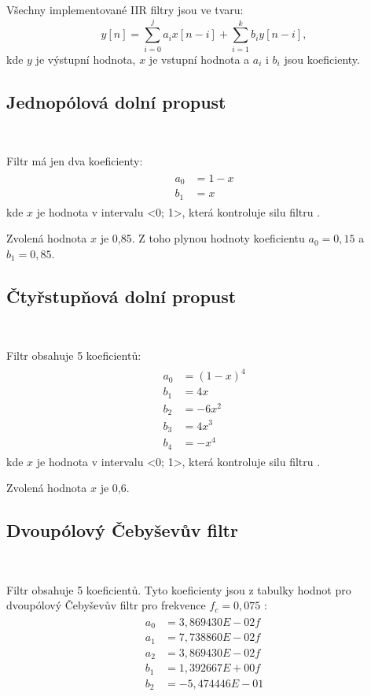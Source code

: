 Všechny implementované IIR filtry jsou ve tvaru:
\begin{equation}
y[n] = \sum_{i = 0}^{j}a_{i}x[n - i] + \sum_{i = 1}^{k}b_{i}y[n - i],
\end{equation}
kde $y$ je výstupní hodnota, $x$ je vstupní hodnota a $a_i$ i $b_i$ jsou
koeficienty.

\subsection{Jednopólová dolní propust}\

Filtr má jen dva koeficienty:
\begin{align}
\begin{split}
a_0 &= 1 - x \\
b_1 &= x
\end{split}
\end{align}
kde $x$ je hodnota v intervalu <0; 1>, která kontroluje silu filtru \cite{Filters}.

Zvolená hodnota $x$ je 0,85. Z toho plynou hodnoty koeficientu $a_0 = 0,15$ 
a $b_1 = 0,85$.

\subsection{Čtyřstupňová dolní propust}\

Filtr obsahuje 5 koeficientů:
\begin{align}
\begin{split}
a_0 &= (1 - x)^4 \\
b_1 &= 4x \\
b_2 &= -6x^2 \\
b_3 &= 4x^3 \\
b_4 &= -x^4
\end{split}
\end{align}
kde $x$ je hodnota v intervalu <0; 1>, která kontroluje silu filtru \cite{Filters}.

Zvolená hodnota $x$ je 0,6.

\subsection{Dvoupólový Čebyševův filtr}\

Filtr obsahuje 5 koeficientů. Tyto koeficienty jsou z tabulky hodnot pro dvoupólový
Čebyševův filtr pro frekvence $f_c = 0,075$ \cite{Filters}:
\begin{align}
\begin{split}
a_0 &= 3,869430E-02f \\
a_1 &= 7,738860E-02f \\
a_2 &= 3,869430E-02f \\
b_1 &= 1,392667E+00f \\
b_2 &= -5,474446E-01 \\
\end{split}
\end{align}

